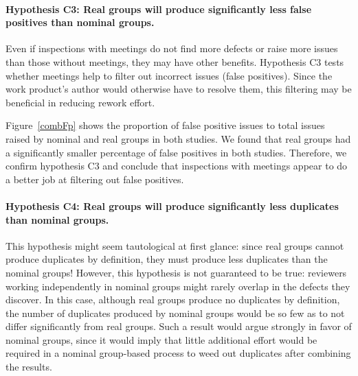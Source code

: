 \paragraph{Hypothesis C3: Real groups will produce significantly less false positives than nominal groups.} 

Even if inspections with meetings do not find more defects or raise more
issues than those without meetings, they may have other benefits.
Hypothesis C3 tests whether meetings help to filter out incorrect issues
(false positives). Since the work product's author would otherwise have to 
resolve them, this filtering may be beneficial in reducing rework effort.

Figure~\ref{combFp} shows the proportion of false positive issues to total
issues raised by nominal and real groups in both studies. We found that
real groups had a significantly smaller percentage of false positives in
both studies.  Therefore, we confirm hypothesis C3 and conclude that
inspections with meetings appear to do a better job at filtering out false
positives.



\paragraph{Hypothesis C4: Real groups will produce significantly less
duplicates than nominal groups. }

This hypothesis might seem tautological at first glance: since real groups
cannot produce duplicates by definition, they must produce less duplicates 
than the nominal groups!  However, this hypothesis is not
guaranteed to be true: reviewers working independently in nominal groups
might rarely overlap in the defects they discover.  In this case, although
real groups produce no duplicates by definition, the number of duplicates
produced by nominal groups would be so few as to not differ significantly
from real groups. Such a result would argue strongly in favor of nominal
groups, since it would imply that little additional effort would be
required in a nominal group-based process to weed out duplicates after
combining the results. 

